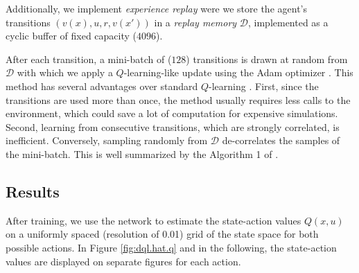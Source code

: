 \documentclass[a4paper, 12pt]{article}
\begin{document}
    Additionally, we implement \emph{experience replay} \cite{lin1993reinforcement} were we store the agent’s transitions $(v(x), u, r, v(x'))$ in a \emph{replay memory} $\mathcal{D}$, implemented as a cyclic buffer of fixed capacity ($4096$).
    
    After each transition, a mini-batch of ($128$) transitions is drawn at random from $\mathcal{D}$ with which we apply a $Q$-learning-like update using the Adam optimizer \cite{kingma2014adam}. This method has several advantages over standard $Q$-learning \cite{mnih2013playing, ernstinfo8003qfunctions}. First, since the transitions are used more than once, the method usually requires less calls to the environment, which could save a lot of computation for expensive simulations. Second, learning from consecutive transitions, which are strongly correlated, is inefficient. Conversely, sampling randomly from $\mathcal{D}$ de-correlates the samples of the mini-batch. This is well summarized by the Algorithm 1 of \textcite{mnih2013playing}.
    
    \subsection{Results}
    
    After training, we use the network to estimate the state-action values $Q(x, u)$ on a uniformly spaced (resolution of \num{0.01}) grid of the state space for both possible actions. In Figure \ref{fig:dql.hat.q} and in the following, the state-action values are displayed on separate figures for each action.
    
\end{document}
